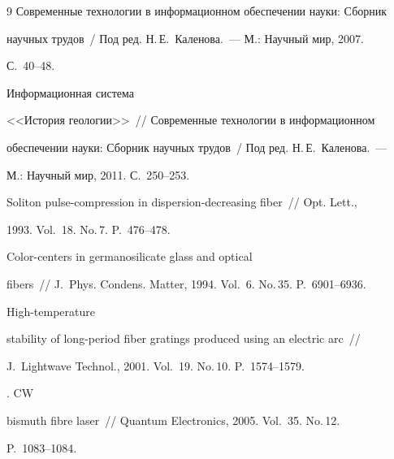 {{\begin{thebibliography}{9}
Современные технологии в информационном обеспечении науки: Сборник 


научных трудов~/ Под ред. Н.\,Е.~Каленова.~--- М.: Научный мир, 2007. 


С.~40--48.




      Информационная система 


<<История геологии>>~/\!\!/ Современные технологии в информационном 


обеспечении науки: Сборник научных трудов~/ Под ред. Н.\,Е.~Каленова.~--- 


М.: Научный мир, 2011. С.~250--253.









Soliton pulse-compression in dispersion-decreasing fiber~/\!\!/ Opt. Lett., 


1993. Vol.~18. No.\,7. P.~476--478.







      Color-centers in germanosilicate glass and optical 


fibers~/\!\!/ J.~Phys. Condens. Matter, 1994. Vol.~6. No.\,35. P.~6901--6936. 







      High-temperature 


stability of long-period fiber gratings produced using an electric arc~/\!\!/ 


J.~Lightwave Technol., 2001. Vol.~19. No.\,10. P.~1574--1579. 







     . CW 


bismuth fibre laser~/\!\!/ Quantum Electronics, 2005. Vol.~35. No.\,12. 


     P.~1083--1084.








 \end{thebibliography}


} }





